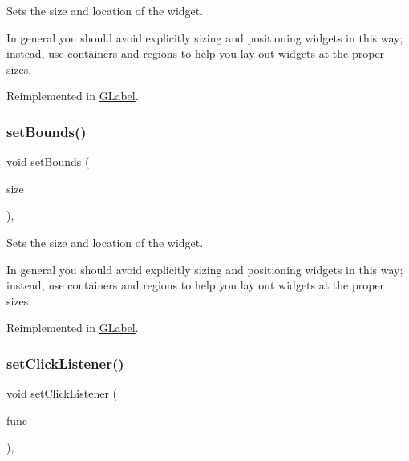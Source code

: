 Sets the size and location of the widget. 

In general you should avoid explicitly sizing and positioning widgets in this way; instead, use containers and regions to help you lay out widgets at the proper sizes. 

Reimplemented in \mbox{\hyperlink{classsgl_1_1GLabel_ab9f89f193ad29d66c547cfee29ffde39}{G\+Label}}.

\mbox{\label{classsgl_1_1GInteractor_acada386653f008cacc7cce86426bef7c}} 
\subsubsection{\texorpdfstring{set\+Bounds()}{setBounds()}\hspace{0.1cm}{\footnotesize\ttfamily [2/2]}}
{\footnotesize\ttfamily void set\+Bounds (\begin{DoxyParamCaption}\item[{const \mbox{\hyperlink{structsgl_1_1GRectangle}{G\+Rectangle}} \&}]{size }\end{DoxyParamCaption})\hspace{0.3cm}{\ttfamily [virtual]}, {\ttfamily [inherited]}}



Sets the size and location of the widget. 

In general you should avoid explicitly sizing and positioning widgets in this way; instead, use containers and regions to help you lay out widgets at the proper sizes. 

Reimplemented in \mbox{\hyperlink{classsgl_1_1GLabel_adb836652705fdc4b7e90b7a3afc56a37}{G\+Label}}.

\mbox{\label{classsgl_1_1GInteractor_abd40af6921242584d0954f173911b190}} 
\subsubsection{\texorpdfstring{set\+Click\+Listener()}{setClickListener()}\hspace{0.1cm}{\footnotesize\ttfamily [1/2]}}
{\footnotesize\ttfamily void set\+Click\+Listener (\begin{DoxyParamCaption}\item[{\mbox{\hyperlink{namespacesgl_ae9f3e9eab70035da1a2b114e21357b25}{G\+Event\+Listener}}}]{func }\end{DoxyParamCaption})\hspace{0.3cm}{\ttfamily [virtual]}, {\ttfamily [inherited]}}



